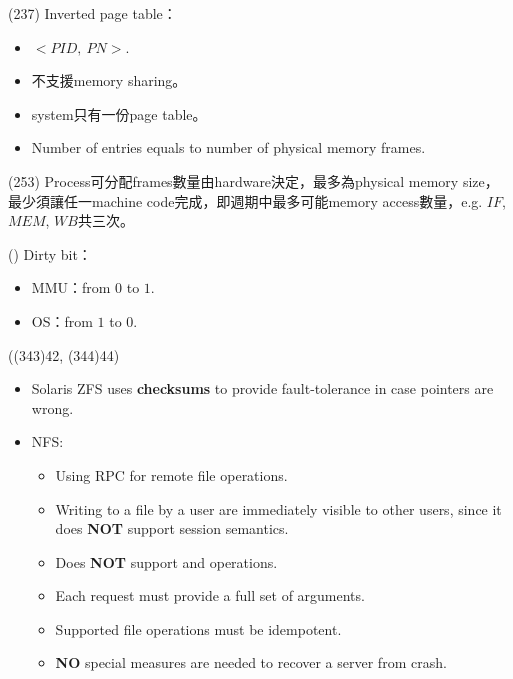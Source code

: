 \begin{theorem}{(237)} Inverted page table：\begin{itemize}
        \item $<PID, \ PN>$.
        \item 不支援memory sharing。
        \item system只有一份page table。
        \item Number of entries equals to number of physical memory frames.
    \end{itemize}
\end{theorem}

\begin{theorem}{(253)} Process可分配frames數量由hardware決定，最多為physical memory size，最少須讓任一machine code完成，即週期中最多可能memory access數量，e.g. $IF$, $MEM$, $WB$共三次。
\end{theorem}

\begin{theorem}{()} Dirty bit：\begin{itemize}
        \item MMU：from $0$ to $1$.
        \item OS：from $1$ to $0$.
    \end{itemize}
\end{theorem}

\begin{theorem}{((343)42, (344)44)} \quad\quad \begin{itemize}
        \item Solaris ZFS uses \textbf{checksums} to provide fault-tolerance in case pointers are wrong.
        \item NFS: \begin{itemize}
            \item Using RPC for remote file operations.
            \item Writing to a file by a user are immediately visible to other users, since it does \textbf{NOT} support session semantics.
            \item Does \textbf{NOT} support  and  operations.
            \item Each request must provide a full set of arguments.
            \item Supported file operations must be idempotent.
            \item \textbf{NO} special measures are needed to recover a server from crash.
        \end{itemize}
    \end{itemize}
\end{theorem}

